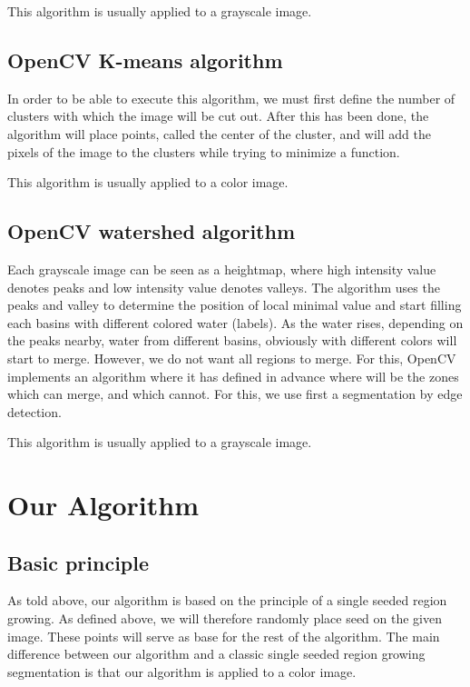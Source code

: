 \documentclass[conference]{IEEEtran}
\begin{document}
This algorithm is usually applied to a grayscale image.


\subsection{OpenCV K-means algorithm}

In order to be able to execute this algorithm, we must first define the number of clusters with which the image will be cut out. After this has been done, the algorithm will place points, called the center of the cluster, and will add the pixels of the image to the clusters while trying to minimize a function.

This algorithm is usually applied to a color image.

\subsection{OpenCV watershed algorithm}

Each grayscale image can be seen as a heightmap, where high intensity value denotes peaks and low intensity value denotes valleys. The algorithm uses the peaks and valley to determine the position of local minimal value and start filling each basins with different colored water (labels). As the water rises, depending on the peaks nearby, water from different basins, obviously with different colors will start to merge. However, we do not want all regions to merge.
For this, OpenCV implements an algorithm where it has defined in advance where will be the zones which can merge, and which cannot. For this, we use first a segmentation by edge detection.

This algorithm is usually applied to a grayscale image.

\section{Our Algorithm}

\subsection{Basic principle}

As told above, our algorithm is based on the principle of a single seeded region growing. As defined above, we will therefore randomly place seed on the given image. These points will serve as base for the rest of the algorithm. The main difference between our algorithm and a classic single seeded region growing segmentation is that our algorithm is applied to a color image. 
\end{document}
